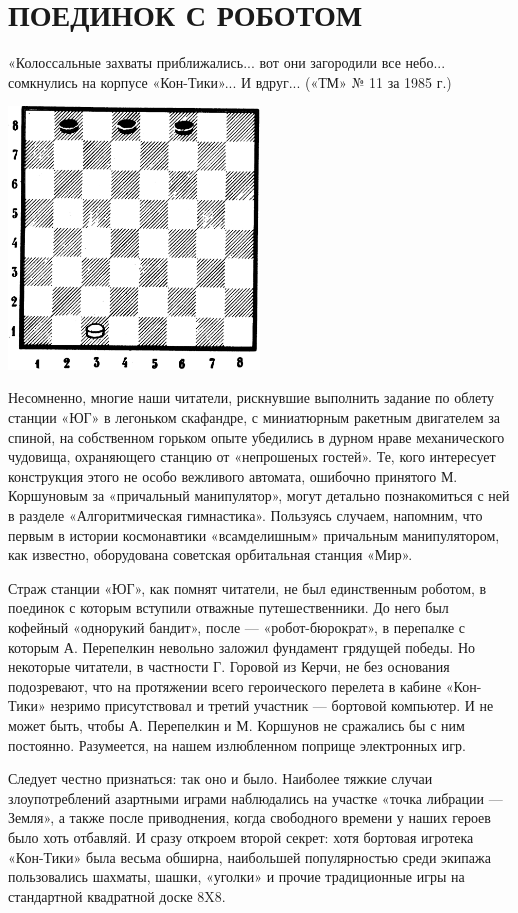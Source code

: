 \documentclass[11pt,a4paper,oneside]{article}
\begin{document}
\section{ПОЕДИНОК С РОБОТОМ}
«Колоссальные захваты приближались... вот они загородили все небо... сомкнулись на корпусе «Кон-Тики»... И вдруг... («ТМ» № 11 за 1985 г.)

\includegraphics[width=0.5\textwidth]{fight_with_robot}

Несомненно, многие наши читатели, рискнувшие выполнить задание по облету станции «ЮГ» в легоньком скафандре, с миниатюрным ракетным двигателем за спиной, на собственном горьком опыте убедились в дурном нраве механического чудовища, охраняющего станцию от «непрошеных гостей». Те, кого интересует конструкция этого не особо вежливого автомата, ошибочно принятого М. Коршуновым за «причальный манипулятор», могут детально познакомиться с ней в разделе «Алгоритмическая гимнастика». Пользуясь случаем, напомним, что первым в истории космонавтики «всамделишным» причальным манипулятором, как известно, оборудована советская орбитальная станция «Мир».

Страж станции «ЮГ», как помнят читатели, не был единственным роботом, в поединок с которым вступили отважные путешественники. До него был кофейный «однорукий бандит», после — «робот-бюрократ», в перепалке с которым А. Перепелкин невольно заложил фундамент грядущей победы. Но некоторые читатели, в частности Г. Горовой из Керчи, не без основания подозревают, что на протяжении всего героического перелета в кабине «Кон-Тики» незримо присутствовал и третий участник — бортовой компьютер. И не может быть, чтобы А. Перепелкин и М. Коршунов не сражались бы с ним постоянно. Разумеется, на нашем излюбленном поприще электронных игр.

Следует честно признаться: так оно и было. Наиболее тяжкие случаи злоупотреблений азартными играми наблюдались на участке «точка либрации — Земля», а также после приводнения, когда свободного времени у наших героев было хоть отбавляй. И сразу откроем второй секрет: хотя бортовая игротека «Кон-Тики» была весьма обширна, наибольшей популярностью среди экипажа пользовались шахматы, шашки, «уголки» и прочие традиционные игры на стандартной квадратной доске 8X8.
\end{document}
